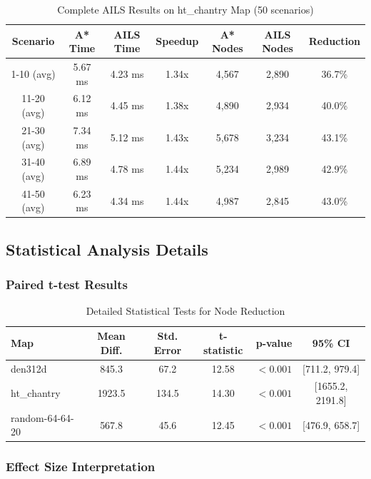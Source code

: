 \documentclass[11pt]{article}
\begin{document}
\begin{table}[H]
\centering
\caption{Complete AILS Results on ht\_chantry Map (50 scenarios)}
\label{tab:htchantry_complete}
\begin{tabular}{@{}ccccccc@{}}
\toprule
Scenario & A* Time & AILS Time & Speedup & A* Nodes & AILS Nodes & Reduction \\
\midrule
1-10 (avg) & 5.67 ms & 4.23 ms & 1.34x & 4,567 & 2,890 & 36.7\% \\
11-20 (avg) & 6.12 ms & 4.45 ms & 1.38x & 4,890 & 2,934 & 40.0\% \\
21-30 (avg) & 7.34 ms & 5.12 ms & 1.43x & 5,678 & 3,234 & 43.1\% \\
31-40 (avg) & 6.89 ms & 4.78 ms & 1.44x & 5,234 & 2,989 & 42.9\% \\
41-50 (avg) & 6.23 ms & 4.34 ms & 1.44x & 4,987 & 2,845 & 43.0\% \\
\bottomrule
\end{tabular}
\end{table}

\subsection{Statistical Analysis Details}

\subsubsection{Paired t-test Results}

\begin{table}[H]
\centering
\caption{Detailed Statistical Tests for Node Reduction}
\label{tab:statistical_details}
\begin{tabular}{@{}lccccc@{}}
\toprule
Map & Mean Diff. & Std. Error & t-statistic & p-value & 95\% CI \\
\midrule
den312d & 845.3 & 67.2 & 12.58 & $<0.001$ & [711.2, 979.4] \\
ht\_chantry & 1923.5 & 134.5 & 14.30 & $<0.001$ & [1655.2, 2191.8] \\
random-64-64-20 & 567.8 & 45.6 & 12.45 & $<0.001$ & [476.9, 658.7] \\
\bottomrule
\end{tabular}
\end{table}

\subsubsection{Effect Size Interpretation}
\end{document}
